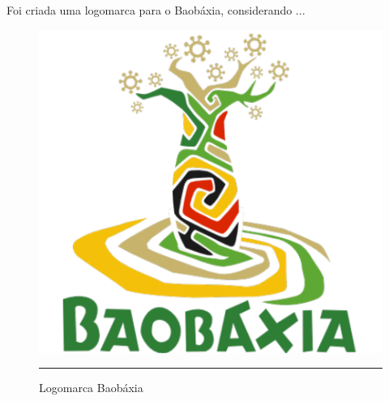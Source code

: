 Foi criada uma logomarca para o Baobáxia, considerando ...


\begin{figure}[htbp]
  \centering
  \includegraphics[width=\textwidth]{./Fig/Logo_BBX.pdf}
  \rule{35em}{0.5pt}
  \caption[Logomarca Baobáxia]{Logomarca Baobáxia}
  \label{fig:Logo_BBX}
\end{figure}

